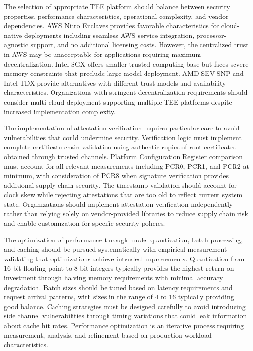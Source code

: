 The selection of appropriate TEE platform should balance between security properties, performance characteristics, operational complexity, and vendor dependencies. AWS Nitro Enclaves provides favorable characteristics for cloud-native deployments including seamless AWS service integration, processor-agnostic support, and no additional licensing costs. However, the centralized trust in AWS may be unacceptable for applications requiring maximum decentralization. Intel SGX offers smaller trusted computing base but faces severe memory constraints that preclude large model deployment. AMD SEV-SNP and Intel TDX provide alternatives with different trust models and availability characteristics. Organizations with stringent decentralization requirements should consider multi-cloud deployment supporting multiple TEE platforms despite increased implementation complexity.

The implementation of attestation verification requires particular care to avoid vulnerabilities that could undermine security. Verification logic must implement complete certificate chain validation using authentic copies of root certificates obtained through trusted channels. Platform Configuration Register comparison must account for all relevant measurements including PCR0, PCR1, and PCR2 at minimum, with consideration of PCR8 when signature verification provides additional supply chain security. The timestamp validation should account for clock skew while rejecting attestations that are too old to reflect current system state. Organizations should implement attestation verification independently rather than relying solely on vendor-provided libraries to reduce supply chain risk and enable customization for specific security policies.

The optimization of performance through model quantization, batch processing, and caching should be pursued systematically with empirical measurement validating that optimizations achieve intended improvements. Quantization from 16-bit floating point to 8-bit integers typically provides the highest return on investment through halving memory requirements with minimal accuracy degradation. Batch sizes should be tuned based on latency requirements and request arrival patterns, with sizes in the range of 4 to 16 typically providing good balance. Caching strategies must be designed carefully to avoid introducing side channel vulnerabilities through timing variations that could leak information about cache hit rates. Performance optimization is an iterative process requiring measurement, analysis, and refinement based on production workload characteristics.

